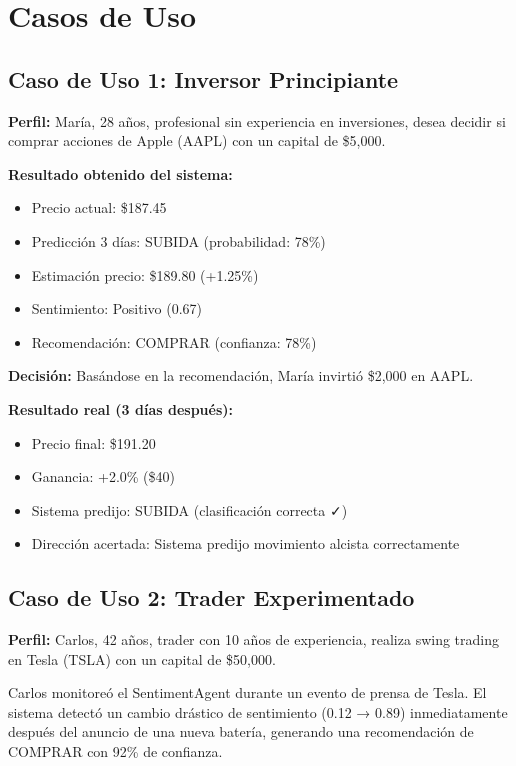 \section{Casos de Uso}

\subsection{Caso de Uso 1: Inversor Principiante}

\textbf{Perfil:} María, 28 años, profesional sin experiencia en inversiones, desea decidir si comprar acciones de Apple (AAPL) con un capital de \$5,000.

\textbf{Resultado obtenido del sistema:}
\begin{itemize}
    \item Precio actual: \$187.45
    \item Predicción 3 días: SUBIDA (probabilidad: 78\%)
    \item Estimación precio: \$189.80 (+1.25\%)
    \item Sentimiento: Positivo (0.67)
    \item Recomendación: COMPRAR (confianza: 78\%)
\end{itemize}

\textbf{Decisión:} Basándose en la recomendación, María invirtió \$2,000 en AAPL.

\textbf{Resultado real (3 días después):}
\begin{itemize}
    \item Precio final: \$191.20
    \item Ganancia: +2.0\% (\$40)
    \item Sistema predijo: SUBIDA (clasificación correcta ✓)
    \item Dirección acertada: Sistema predijo movimiento alcista correctamente
\end{itemize}

\subsection{Caso de Uso 2: Trader Experimentado}

\textbf{Perfil:} Carlos, 42 años, trader con 10 años de experiencia, realiza swing trading en Tesla (TSLA) con un capital de \$50,000.

Carlos monitoreó el SentimentAgent durante un evento de prensa de Tesla. El sistema detectó un cambio drástico de sentimiento (0.12 → 0.89) inmediatamente después del anuncio de una nueva batería, generando una recomendación de COMPRAR con 92\% de confianza.

